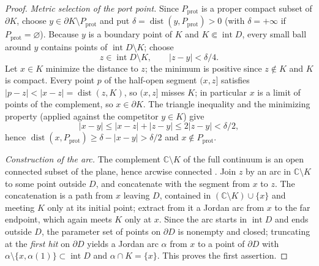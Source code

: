 \documentclass[11pt,reqno]{amsart}
\theoremstyle{definition}
\theoremstyle{remark}
\newcommand{\C}{\mathbb C}
\newcommand{\Int}{\operatorname{int}}
\newcommand{\dist}{\operatorname{dist}}
\begin{document}
\begin{proof}
\emph{Metric selection of the port point.}
Since $P_{\mathrm{prot}}$ is a proper compact subset of $\partial K$,
choose $y\in\partial K\setminus P_{\mathrm{prot}}$ and put
$\delta=\dist(y,P_{\mathrm{prot}})>0$ (with $\delta=+\infty$ if
$P_{\mathrm{prot}}=\varnothing$).  Because $y$ is a boundary point of $K$
and $K\Subset\Int D$, every small ball around $y$ contains points of
$\Int D\setminus K$; choose
\[
z\in\Int D\setminus K,\qquad |z-y|<\delta/4 .
\]
Let $x\in K$ minimize the distance to $z$; the minimum is positive since
$z\notin K$ and $K$ is compact.  Every point $p$ of the half-open segment
$(x,z]$ satisfies $|p-z|<|x-z|=\dist(z,K)$, so $(x,z]$ misses $K$; in
particular $x$ is a limit of points of the complement, so
$x\in\partial K$.  The triangle inequality and the minimizing property
(applied against the competitor $y\in K$) give
\[
|x-y|\le|x-z|+|z-y|\le 2|z-y|<\delta/2 ,
\]
hence
$\dist(x,P_{\mathrm{prot}})\ge\delta-|x-y|>\delta/2$ and
$x\notin P_{\mathrm{prot}}$.

\emph{Construction of the arc.}
The complement $\C\setminus K$ of the full continuum is an open connected
subset of the plane, hence arcwise connected \cite{New51}.  Join $z$ by
an arc in $\C\setminus K$ to some point outside $D$, and concatenate
with the segment from $x$ to $z$.  The concatenation is a path from $x$
leaving $D$, contained in $(\C\setminus K)\cup\{x\}$ and meeting $K$ only
at its initial point; extract from it a Jordan arc from $x$ to the far
endpoint, which again meets $K$ only at $x$.  Since the arc starts in
$\Int D$ and ends outside $D$, the parameter set of points on $\partial
D$ is nonempty and closed; truncating at the \emph{first hit} on
$\partial D$ yields a Jordan arc $\alpha$ from $x$ to a point of
$\partial D$ with $\alpha\setminus\{x,\alpha(1)\}\subset\Int D$ and
$\alpha\cap K=\{x\}$.  This proves the first assertion.


\end{proof}
\end{document}
